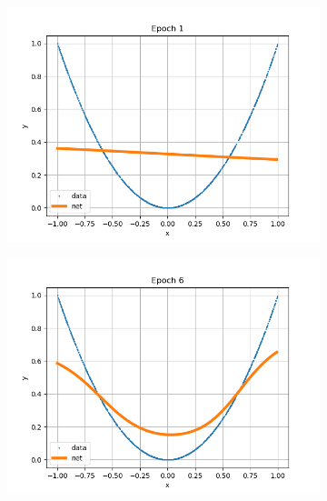 \documentclass[12pt,a4paper]{article}
\begin{document}
\begin{figure}
\begin{subfigure}{.32\textwidth}
\includegraphics[scale=0.3]{Images/ALearningNet1.png}
\caption{}
\label{training1}
\end{subfigure}
\begin{subfigure}{.32\textwidth}
\includegraphics[scale=0.3]{Images/ALearningNet6.png}
\caption{}
\label{training2}
\end{subfigure}
\begin{subfigure}{.32\textwidth}

\end{subfigure}
\end{figure}
\end{document}
